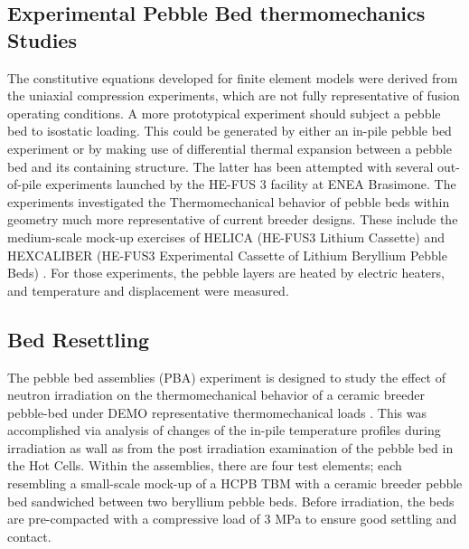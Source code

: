 \subsection{Experimental Pebble Bed thermomechanics Studies}
The constitutive equations developed for finite element models were derived from the uniaxial compression experiments, which are not fully representative of fusion operating conditions. A more prototypical experiment should subject a pebble bed to isostatic loading. This could be generated by either an in-pile pebble bed experiment or by making use of differential thermal expansion between a pebble bed and its containing structure. The latter has been attempted with several out-of-pile experiments launched by the HE-FUS 3 facility at ENEA Brasimone. The experiments investigated the Thermomechanical behavior of pebble beds within geometry much more representative of current breeder designs. These include the medium-scale mock-up exercises of HELICA (HE-FUS3 Lithium Cassette) and HEXCALIBER (HE-FUS3 Experimental Cassette of Lithium Beryllium Pebble Beds) \cite{dellorco:2006,DiMaio20081287}. For those experiments, the pebble layers are heated by electric heaters, and temperature and displacement were measured.





\subsection{Bed Resettling}

The pebble bed assemblies (PBA) experiment is designed to study the effect of neutron irradiation on the thermomechanical behavior of a ceramic breeder pebble-bed under DEMO representative thermomechanical loads \cite{Magielsen2007}. This was accomplished via analysis of changes of the in-pile temperature profiles during irradiation as wall as from the post irradiation examination of the pebble bed in the Hot Cells. Within the assemblies, there are four test elements; each resembling a small-scale mock-up of a HCPB TBM with a ceramic breeder pebble bed sandwiched between two beryllium pebble beds. Before irradiation, the beds are pre-compacted with a compressive load of 3 MPa to ensure good settling and contact.  

